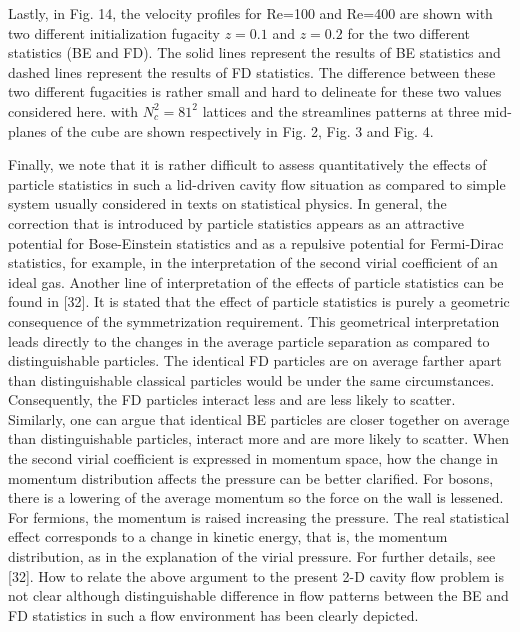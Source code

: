 \documentclass[doublecol]{epl2}
\begin{document}


Lastly, in Fig. 14, the velocity profiles for Re=100 and Re=400 are shown with two different initialization fugacity $z=0.1$ and $z=0.2$ for the two different statistics (BE and FD).   The solid lines represent the results of BE statistics and dashed lines represent the results of FD statistics.  The difference between these two different fugacities is rather small and hard to delineate for these two values considered here.
with $N_c^2=81^2$ lattices and the streamlines patterns at three mid-planes of the cube are shown respectively in Fig. 2, Fig. 3 and Fig. 4.

Finally, we note that it is rather difficult to assess quantitatively the effects of particle statistics in such a lid-driven cavity flow situation as compared to simple system usually considered in texts on statistical physics. In general, the correction that is introduced by particle statistics appears as an attractive potential for Bose-Einstein statistics and as a repulsive potential for Fermi-Dirac statistics, for example, in the interpretation of the second virial coefficient of an ideal gas. Another line of interpretation of the effects of particle statistics can be found in [32].
It is stated that the effect of particle statistics is purely a geometric consequence of the symmetrization requirement. This geometrical interpretation leads directly to the changes in the average particle separation as compared to distinguishable particles. The identical FD particles are on average farther apart than distinguishable classical particles would be under the same circumstances. Consequently, the FD particles interact less and are less likely to scatter. Similarly, one can argue that identical BE particles are closer together on average than distinguishable particles, interact more and are more likely to scatter. When the second virial coefficient is expressed in momentum space, how the change in momentum distribution affects the pressure can be better clarified. For bosons, there is a lowering of the average momentum so the force on the wall is lessened.  For fermions, the momentum is raised increasing the pressure. The real statistical effect corresponds to a change in kinetic energy, that is, the momentum distribution, as in the explanation of the virial pressure. For further details, see [32]. How to relate the above argument to the present 2-D cavity flow problem is not clear although distinguishable difference in flow patterns between the BE and FD statistics in such a flow environment has been clearly depicted.
\end{document}
